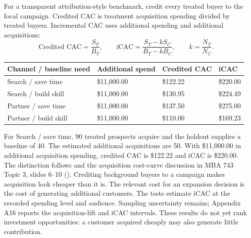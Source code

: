 \documentclass[10pt]{article}
\begin{document}
\NewPage
{}
For a transparent attribution-style benchmark, credit every treated buyer to the focal campaign. Credited CAC is treatment acquisition spending divided by treated buyers. Incremental CAC uses additional spending and additional acquisitions:
\[
\text{Credited CAC}=\frac{S_T}{B_T},\qquad
\mathrm{iCAC}=\frac{S_T-kS_C}{B_T-kB_C},\qquad k=\frac{N_T}{N_C}.
\]
{\fontsize{8.5}{10.5}\selectfont \par\begin{tabularx}{\linewidth}{@{}p{.29\linewidth}YYY@{}}\toprule
\textbf{Channel / baseline need} & \textbf{Additional spend} & \textbf{Credited CAC} & \textbf{iCAC}\\\midrule
Search / save time & \$11,000.00 & \$122.22 & \$220.00\\
Search / build skill & \$11,000.00 & \$130.95 & \$224.49\\
Partner / save time & \$11,000.00 & \$137.50 & \$275.00\\
Partner / build skill & \$11,000.00 & \$110.00 & \$169.23\\
\bottomrule\end{tabularx}\par}
For Search / save time, 90 treated prospects acquire and the holdout supplies a baseline of 40. The estimated additional acquisitions are 50. With \$11,000.00 in additional acquisition spending, credited CAC is \$122.22 and iCAC is \$220.00.
The distinction follows  and the acquisition cost-curve discussion in MBA 743 Topic 3, slides 6--10 (). Crediting background buyers to a campaign makes acquisition look cheaper than it is. The relevant cost for an expansion decision is the cost of generating additional customers.
The tests estimate iCAC at the recorded spending level and audience. Sampling uncertainty remains; Appendix A16 reports the acquisition-lift and iCAC intervals. These results do not yet rank investment opportunities: a customer acquired cheaply may also generate little contribution.
\end{document}

